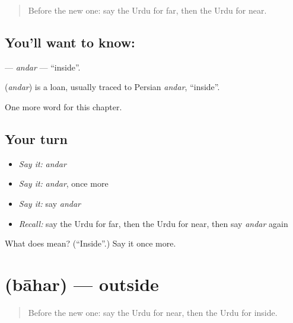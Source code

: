 \label{lesson:UR-C78-andar}



\begin{quote}
Before the new one: say the Urdu for far, then the Urdu for near.
\end{quote}

\subsection*{You'll want to know: }
\textbf{} — \emph{andar} — \textquotedblleft{}inside\textquotedblright{}.

\begin{cousinweb}
\textbf{} (\emph{andar}) is a loan, usually traced to Persian \emph{andar}, \textquotedblleft{}inside\textquotedblright{}.
\end{cousinweb}

\begin{grammarlens}[title={What you've built}]
One more word for this chapter.
\end{grammarlens}

\subsection*{Your turn}
\begin{itemize}
\raggedright
  \item \emph{Say it:} \emph{andar}
  \item \emph{Say it:} \emph{andar}, once more
  \item \emph{Say it:} say \emph{andar}
  \item \emph{Recall:} say the Urdu for far, then the Urdu for near, then say \emph{andar} again
\end{itemize}

\begin{tcolorbox}[breakable,colback=teal!4,colframe=teal!35!black,title={Before you move on}]
What does  mean? (\textquotedblleft{}Inside\textquotedblright{}.) Say it once more.
\end{tcolorbox}
\section[\texorpdfstring{\ur{باہر} (bāhar)}{باہر (bāhar)}]{ (bāhar) — outside}

\label{lesson:UR-C78-bahar}



\begin{quote}
Before the new one: say the Urdu for near, then the Urdu for inside.
\end{quote}

